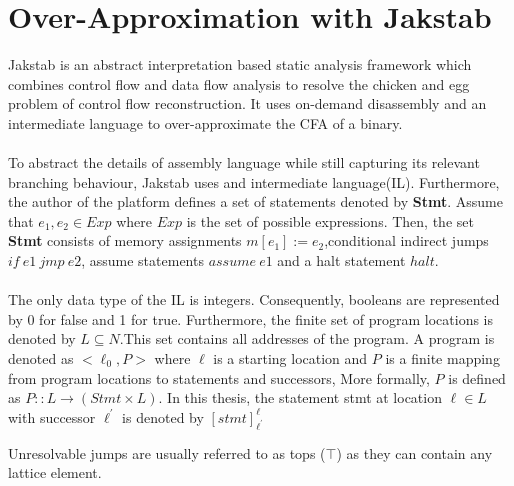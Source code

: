 \documentclass{kththesis}
\begin{document}




\section{Over-Approximation with Jakstab}
Jakstab\cite{Jakstab} is an abstract interpretation based static analysis framework which combines control flow and data flow analysis to resolve the chicken and egg problem of control flow reconstruction. It uses on-demand disassembly and an intermediate language to over-approximate the CFA of a binary.
\\ \\
To abstract the details of assembly language while still capturing its relevant branching behaviour, Jakstab uses and intermediate language(IL). Furthermore, the author of the platform defines a set of statements denoted by \textbf{Stmt}. Assume that $e_1,e_2 \in Exp$ where $Exp$ is the set of possible expressions. Then, the set \textbf{Stmt} consists of memory assignments $m[e_1] := e_2$,conditional indirect jumps $if\:e1\:jmp\:e2$, assume statements $assume\:e1$ and a halt statement $halt$.
\\ \\
The only data type of the IL is integers. Consequently, booleans are represented by 0 for false and 1 for true. Furthermore, the finite set of program locations is denoted by $L \subseteq N$.This set contains all addresses of the program. A program is denoted as $<\ell_0,P>$ where $\ell$ is a starting location and $P$ is a finite mapping from program locations to statements and successors, More formally, $P$ is defined as $P:: L \rightarrow (Stmt \times L)$. In this thesis, the statement stmt at location $\ell \in L$ with successor $\ell^{'}$ is denoted by $[stmt]^{\ell}_{\ell^{'}}$ 

Unresolvable jumps are usually referred to as tops ($\top$) as they can contain any lattice element.
\end{document}
